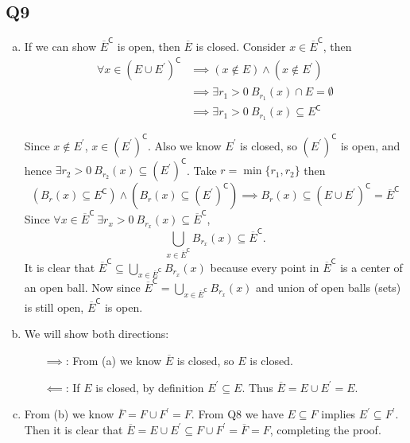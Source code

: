 \documentclass[12pt,lettersize]{article}
\newcommand{\com}{\mathsf{C}}
\theoremstyle{remark}
\begin{document}
	\subsection*{Q9}
	\begin{enumerate}[(a)]
		\item If we can show $\overline{E}^\com$ is open, then $\overline{E}$ is closed. Consider $x\in\overline{E}^\com$, then
		\begin{align*}
			\forall x\in(E\cup E^\prime)^\com &\implies (x\notin E)\land(x\notin E^\prime)\\
								   &\implies \exists r_1>0\ B_{r_1}(x)\cap E=\emptyset\\
								   &\implies \exists r_1>0\ B_{r_1}(x)\subseteq E^\com
		\end{align*}
		
		Since $x\notin E^\prime$, $x\in(E^\prime)^\com$. Also we know $E^\prime$ is closed, so $(E^\prime)^\com$ is open, and hence $\exists r_2>0\ B_{r_2}(x)\subseteq (E^\prime)^\com$. Take $r=\min\{r_1,r_2\}$ then
		\begin{displaymath}
			(B_r(x)\subseteq E^\com)\land(B_r(x)\subseteq (E^\prime)^\com)\implies B_r(x)\subseteq(E\cup E^\prime)^\com=\overline{E}^\com
		\end{displaymath}
		Since $\forall x\in\overline{E}^\com\ \exists r_x>0\ B_{r_x}(x)\subseteq\overline{E}^\com$,
		\begin{displaymath}
			\bigcup_{x\in\overline{E}^\com}^{}B_{r_x}(x)\subseteq \overline{E}^\com.
		\end{displaymath} 
		It is clear that $\overline{E}^\com\subseteq\bigcup_{x\in\overline{E}^\com}B_{r_x}(x)$ because every point in $\overline{E}^\com$ is a center of an open ball. Now since $\overline{E}^\com=\bigcup_{x\in\overline{E}^\com}B_{r_x}(x)$ and union of open balls (sets) is still open, $\overline{E}^\com$ is open. 
		
		\item We will show both directions:
		\begin{itemize}
			\item[$\implies$:] From (a) we know $\overline{E}$ is closed, so $E$ is closed.
			\item[$\impliedby$:] If $E$ is closed, by definition $E^\prime\subseteq E$. Thus $\overline{E}=E\cup E^\prime=E$.
		\end{itemize}
	
		\item From (b) we know $\overline{F}=F\cup F^\prime=F$. From Q8 we have $E\subseteq F$ implies $E^\prime\subseteq F^\prime$. Then it is clear that $\overline{E}=E\cup E^\prime\subseteq F\cup F^\prime=\overline{F}=F$, completing the proof.
	\end{enumerate}
	\newpage
	
\end{document}
